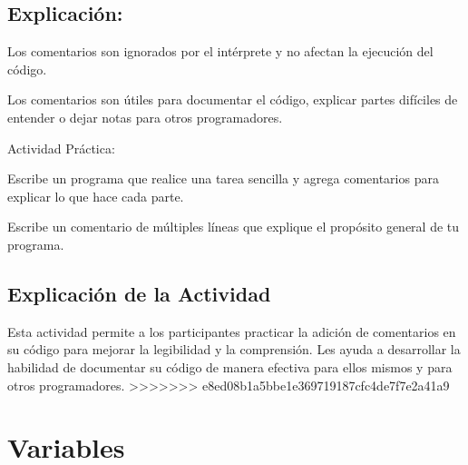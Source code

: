 \documentclass[
  a4paper,
  DIV=11,
  numbers=noendperiod,
  onepage,
  openany]{scrreprt}
\begin{document}
\hypertarget{explicaciuxf3n-9}{%
\section{Explicación:}\label{explicaciuxf3n-9}}

Los comentarios son ignorados por el intérprete y no afectan la
ejecución del código.

Los comentarios son útiles para documentar el código, explicar partes
difíciles de entender o dejar notas para otros programadores.

\begin{tcolorbox}[enhanced jigsaw, colbacktitle=quarto-callout-important-color!10!white, toprule=.15mm, leftrule=.75mm, titlerule=0mm, opacityback=0, rightrule=.15mm, opacitybacktitle=0.6, breakable, left=2mm, coltitle=black, title=\textcolor{quarto-callout-important-color}{\faExclamation}\hspace{0.5em}{Important}, toptitle=1mm, bottomtitle=1mm, arc=.35mm, bottomrule=.15mm, colback=white, colframe=quarto-callout-important-color-frame]

Actividad Práctica:

Escribe un programa que realice una tarea sencilla y agrega comentarios
para explicar lo que hace cada parte.

Escribe un comentario de múltiples líneas que explique el propósito
general de tu programa.

\end{tcolorbox}

\hypertarget{explicaciuxf3n-de-la-actividad-7}{%
\section{Explicación de la
Actividad}\label{explicaciuxf3n-de-la-actividad-7}}

Esta actividad permite a los participantes practicar la adición de
comentarios en su código para mejorar la legibilidad y la comprensión.
Les ayuda a desarrollar la habilidad de documentar su código de manera
efectiva para ellos mismos y para otros programadores.
\textgreater\textgreater\textgreater\textgreater\textgreater\textgreater\textgreater{}
e8ed08b1a5bbe1e369719187cfc4de7f7e2a41a9

\hypertarget{variables-2}{%
\chapter{Variables}\label{variables-2}}
\end{document}

